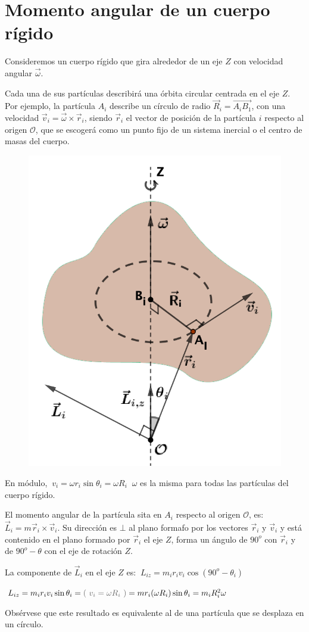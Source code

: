 \section{Momento angular de un cuerpo rígido}

\begin{multicols}{2}
Consideremos un cuerpo rígido que gira alrededor de un eje $Z$ con velocidad angular $\vec \omega$.

Cada una de sus partículas describirá una órbita circular centrada en el eje $Z$. Por ejemplo, la partícula $A_i$ describe un círculo de radio $\vec R_i=\overrightarrow{A_iB_1}$, con una velocidad $\vec v_i=\vec \omega \times \vec r_i$, siendo $\vec r_i$ el vector de posición de la partícula $i$ respecto al origen $\mathcal O$, que se escogerá como un punto fijo de un sistema inercial o el centro de masas del cuerpo.
\begin{figure}[H]
	\centering
	\includegraphics[width=.3\textwidth]{imagenes/imagenes16/T16IM02.png}
\end{figure}
\end{multicols}

En módulo, $\ v_i=\omega r_i \sin \theta_i=\omega R_i$ \textcolor{gris}{$\ \omega$ es la misma para todas las partículas del cuerpo rígido.}

El momento angular de la partícula sita en $A_i$ respecto al origen $\mathcal O$, es:
$\vec L_i=m\vec r_i \times \vec v_i$. Su dirección es $\bot$ al plano formafo por los vectores $\vec r_i \text{ y } \vec v_i$ y está contenido en el plano formado por $\vec r_i$ el eje $Z$, forma un ángulo de $90^o$ con $\vec r_i$ y de $90^o - \theta$ con el eje de rotación $Z$.

La componente de $\vec L_i$ en el eje $Z$ es: $\ L_{iz}=m_ir_iv_i \cos (90^o-\theta_i)$

$L_{iz}=m_ir_iv_i
\sin \theta_i=\textcolor{gris}{(\ v_i=\omega R_i \ )}=mr_i (\omega R_i) \sin \theta_i =m_i R_i^2 \omega$ 

Obsérvese que este resultado es equivalente al de una partícula que se desplaza en un círculo.

